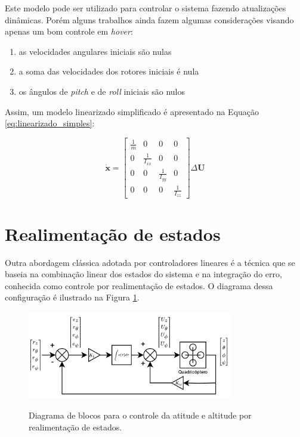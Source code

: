 \documentclass[main.tex]{subfiles}
\begin{document}
Este modelo pode ser utilizado para controlar o sistema fazendo atualizações dinâmicas. Porém alguns trabalhos ainda fazem algumas considerações visando apenas um bom controle em \textit{hover}:

\begin{enumerate}
    \item as velocidades angulares iniciais são nulas
    \item a soma das velocidades dos rotores iniciais é nula
    \item os ângulos de \textit{pitch} e de \textit{roll} iniciais são nulos
\end{enumerate}

Assim, um modelo linearizado simplificado é apresentado na Equação \ref{eq:linearizado_simples}:

\begin{equation}\label{eq:linearizado_simples}
    \boldsymbol{\dot{x}} = 
    \begin{bmatrix}
        \frac{1}{m}&0&0&0\\ 
        0&\frac{1}{I_{xx}}&0&0\\
        0&0&\frac{1}{I_{yy}}&0\\
        0&0&0&\frac{1}{I_{zz}}
    \end{bmatrix}
    \Delta\boldsymbol{U}
\end{equation}

\section{Realimentação de estados}

Outra abordagem clássica adotada por controladores lineares é a técnica que se baseia na combinação linear dos estados do sistema e na integração do erro, conhecida como controle por realimentação de estados. O diagrama dessa configuração é ilustrado na Figura \ref{fig:realimentacao_estados}.

\begin{figure}[!h]
    \centering
    \caption{Diagrama de blocos para o controle da atitude e altitude por realimentação de estados.}
    \includegraphics[width=0.8\textwidth]{capitulos/controle_atitude/imgs/controle_realimentacao_estados.png}
    \label{fig:realimentacao_estados}
\end{figure}
\end{document}
